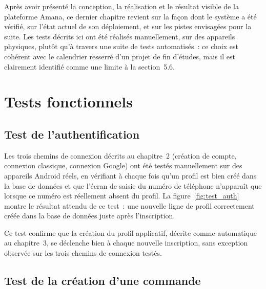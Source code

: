 \documentclass[12pt,fleqn,a4paper]{report}
\begin{document}
\begin{justify}
Après avoir présenté la conception, la réalisation et le résultat visible de la plateforme Amana, ce dernier chapitre revient sur la façon dont le système a été vérifié, sur l'état actuel de son déploiement, et sur les pistes envisagées pour la suite. Les tests décrits ici ont été réalisés manuellement, sur des appareils physiques, plutôt qu'à travers une suite de tests automatisés~: ce choix est cohérent avec le calendrier resserré d'un projet de fin d'études, mais il est clairement identifié comme une limite à la section~5.6.

\section{Tests fonctionnels}

\subsection{Test de l'authentification}

Les trois chemins de connexion décrits au chapitre~2 (création de compte, connexion classique, connexion Google) ont été testés manuellement sur des appareils Android réels, en vérifiant à chaque fois qu'un profil est bien créé dans la base de données et que l'écran de saisie du numéro de téléphone n'apparaît que lorsque ce numéro est réellement absent du profil. La figure~\ref{fig:test_auth} montre le résultat attendu de ce test~: une nouvelle ligne de profil correctement créée dans la base de données juste après l'inscription.


Ce test confirme que la création du profil applicatif, décrite comme automatique au chapitre~3, se déclenche bien à chaque nouvelle inscription, sans exception observée sur les trois chemins de connexion testés.

\subsection{Test de la création d'une commande}


\end{justify}
\end{document}
